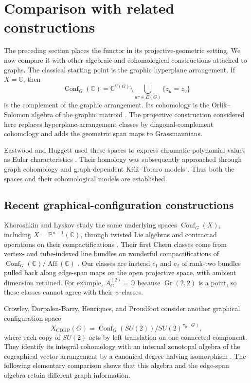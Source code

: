 \documentclass[11pt]{amsart}
\theoremstyle{plain}
\theoremstyle{definition}
\theoremstyle{remark}
\newcommand{\Q}{\mathbb{Q}}
\newcommand{\C}{\mathbb{C}}
\newcommand{\PP}{\mathbb{P}}
\newcommand{\Conf}{\operatorname{Conf}}
\newcommand{\Gr}{\operatorname{Gr}}
\begin{document}
\section{Comparison with related constructions}
\label{sec:related-constructions}

The preceding section places the functor in its projective-geometric setting.
We now compare it with other algebraic and cohomological constructions attached
to graphs.  The classical starting point is the graphic hyperplane arrangement.
If
$X=\C$, then
\[
  \Conf_G(\C)
  =\C^{V(G)}\setminus\bigcup_{uv\in E(G)}\{z_u=z_v\}
\]
is the complement of the graphic arrangement.  Its cohomology is the
Orlik--Solomon algebra of the graphic matroid
\cite{OrlikSolomon}.  The projective construction considered here replaces
hyperplane-arrangement classes by diagonal-complement cohomology and adds the
geometric span maps to Grassmannians.

Eastwood and Huggett used these spaces to express chromatic-polynomial values
as Euler characteristics \cite{EastwoodHuggett}.
Their homology was subsequently approached through graph cohomology and
graph-dependent K\v{r}{\'\i}\v{z}--Totaro models
\cite{BaranovskySazdanovic,BokstedtMinuz}.  Thus both the spaces and their
cohomological models are established.

\subsection{Recent graphical-configuration constructions}

Khoroshkin and Lyskov study the same underlying spaces $\Conf_G(X)$, including
$X=\PP^{n-1}(\C)$, through twisted Lie algebras and contractad operations on
their compactifications \cite[Theorem~2.7]{KhoroshkinLyskov}.  Their first
Chern classes come from vertex- and tube-indexed line bundles on wonderful
compactifications of $\Conf_G(\C)/\operatorname{Aff}(\C)$
\cite[Section~5.1]{KhoroshkinLyskov}.  Our classes are instead $c_1$ and $c_2$
of rank-two bundles pulled back along edge-span maps on the open projective
space, with ambient dimension retained.  For example, $A_G^{(2)}=\Q$ because
$\Gr(2,2)$ is a point, so these classes cannot agree with their $\psi$-classes.

Crowley, Dorpalen-Barry, Henriques, and Proudfoot consider another graphical
configuration space
\[
  X_{\mathrm{CDHP}}(G)
  =\Conf_G(SU(2))/SU(2)^{\pi_0(G)},
\]
where each copy of $SU(2)$ acts by left translation on one connected
component.  They identify its integral cohomology with an internal zonotopal
algebra of the cographical vector arrangement by a canonical degree-halving
isomorphism \cite[Theorem~1.9]{CrowleyEtAl}.  The following elementary
comparison shows that this algebra and the edge-span algebra retain different
graph information.
\end{document}

